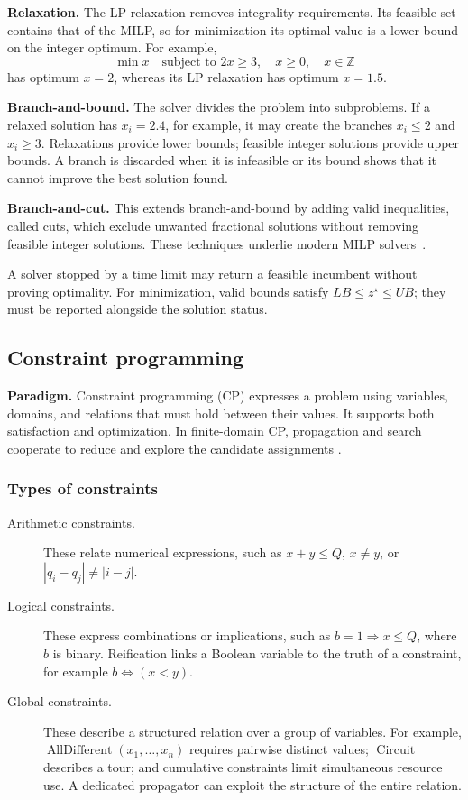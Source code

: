 \textbf{Relaxation.} The LP relaxation removes integrality requirements.
Its feasible set contains that of the MILP, so for minimization its optimal
value is a lower bound on the integer optimum. For example,
\[
 \min x\quad\text{subject to }2x\geq3,\quad x\geq0,\quad x\in\mathbb{Z}
\]
has optimum $x=2$, whereas its LP relaxation has optimum $x=1.5$.

\textbf{Branch-and-bound.} The solver divides the problem into subproblems.
If a relaxed solution has $x_i=2.4$, for example, it may create the branches
$x_i\leq2$ and $x_i\geq3$. Relaxations provide lower bounds; feasible integer
solutions provide upper bounds. A branch is discarded when it is infeasible
or its bound shows that it cannot improve the best solution found.

\textbf{Branch-and-cut.} This extends branch-and-bound by adding valid
inequalities, called cuts, which exclude unwanted fractional solutions
without removing feasible integer solutions. These techniques underlie
modern MILP solvers~\cite{gurobiMipBasics,gurobiDocs}.

A solver stopped by a time limit may return a feasible incumbent without
proving optimality. For minimization, valid bounds satisfy
$LB\leq z^\star\leq UB$; they must be reported alongside the solution status.

\subsection{Constraint programming}

\textbf{Paradigm.} Constraint programming (CP) expresses a problem using
variables, domains, and relations that must hold between their values. It
supports both satisfaction and optimization. In finite-domain CP, propagation
and search cooperate to reduce and explore the candidate assignments
\cite{rossi2006handbook}.

\subsubsection{Types of constraints}

\begin{description}
\item[Arithmetic constraints.] These relate numerical expressions, such as
$x+y\leq Q$, $x\neq y$, or $|q_i-q_j|\neq|i-j|$.
\item[Logical constraints.] These express combinations or implications, such
as $b=1\Rightarrow x\leq Q$, where $b$ is binary. Reification links a Boolean
variable to the truth of a constraint, for example $b\Leftrightarrow(x<y)$.
\item[Global constraints.] These describe a structured relation over a group
of variables. For example, $\operatorname{AllDifferent}(x_1,\ldots,x_n)$
requires pairwise distinct values; $\operatorname{Circuit}$ describes a tour;
and cumulative constraints limit simultaneous resource use. A dedicated
propagator can exploit the structure of the entire relation.
\end{description}

